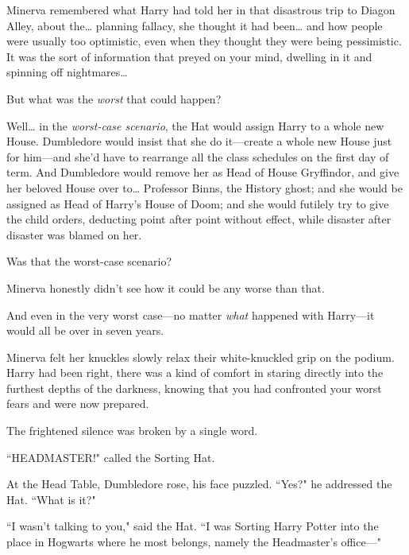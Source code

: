 Minerva remembered what Harry had told her in that disastrous trip to Diagon Alley, about the{\ldots} planning fallacy, she thought it had been{\ldots} and how people were usually too optimistic, even when they thought they were being pessimistic. It was the sort of information that preyed on your mind, dwelling in it and spinning off nightmares{\ldots}

But what was the \emph{worst} that could happen?

Well{\ldots} in the \emph{worst-case scenario}, the Hat would assign Harry to a whole new House. Dumbledore would insist that she do it—create a whole new House just for him—and she'd have to rearrange all the class schedules on the first day of term. And Dumbledore would remove her as Head of House Gryffindor, and give her beloved House over to{\ldots} Professor Binns, the History ghost; and she would be assigned as Head of Harry's House of Doom; and she would futilely try to give the child orders, deducting point after point without effect, while disaster after disaster was blamed on her.

Was that the worst-case scenario?

Minerva honestly didn't see how it could be any worse than that.

And even in the very worst case—no matter \emph{what} happened with Harry—it would all be over in seven years.

Minerva felt her knuckles slowly relax their white-knuckled grip on the podium. Harry had been right, there was a kind of comfort in staring directly into the furthest depths of the darkness, knowing that you had confronted your worst fears and were now prepared.

The frightened silence was broken by a single word.

``HEADMASTER!" called the Sorting Hat.

At the Head Table, Dumbledore rose, his face puzzled. ``Yes?" he addressed the Hat. ``What is it?"

``I wasn't talking to you," said the Hat. ``I was Sorting Harry Potter into the place in Hogwarts where he most belongs, namely the Headmaster's office—"


